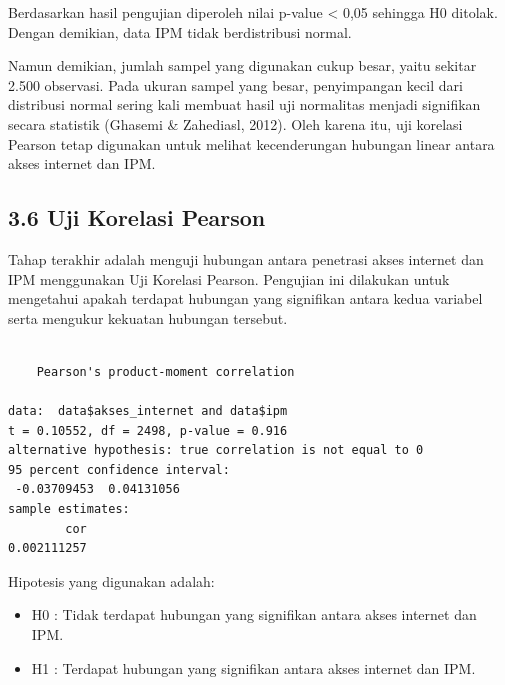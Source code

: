 \documentclass[
  indonesian,
  letterpaper,
  DIV=11,
  numbers=noendperiod]{scrartcl}
\newenvironment{Shaded}{\begin{snugshade}}{\end{snugshade}}
\newcommand{\AttributeTok}[1]{\textcolor[rgb]{0.40,0.45,0.13}{#1}}
\newcommand{\FunctionTok}[1]{\textcolor[rgb]{0.28,0.35,0.67}{#1}}
\newcommand{\NormalTok}[1]{\textcolor[rgb]{0.00,0.23,0.31}{#1}}
\newcommand{\OtherTok}[1]{\textcolor[rgb]{0.00,0.23,0.31}{#1}}
\newcommand{\SpecialCharTok}[1]{\textcolor[rgb]{0.37,0.37,0.37}{#1}}
\newcommand{\StringTok}[1]{\textcolor[rgb]{0.13,0.47,0.30}{#1}}
\providecommand{\tightlist}{%
  \setlength{\itemsep}{0pt}\setlength{\parskip}{0pt}}
\begin{document}
Berdasarkan hasil pengujian diperoleh nilai p-value \textless{} 0,05
sehingga H0 ditolak. Dengan demikian, data IPM tidak berdistribusi
normal.

Namun demikian, jumlah sampel yang digunakan cukup besar, yaitu sekitar
2.500 observasi. Pada ukuran sampel yang besar, penyimpangan kecil dari
distribusi normal sering kali membuat hasil uji normalitas menjadi
signifikan secara statistik (Ghasemi \& Zahediasl, 2012). Oleh karena
itu, uji korelasi Pearson tetap digunakan untuk melihat kecenderungan
hubungan linear antara akses internet dan IPM.

\subsection{3.6 Uji Korelasi Pearson}\label{uji-korelasi-pearson}

Tahap terakhir adalah menguji hubungan antara penetrasi akses internet
dan IPM menggunakan Uji Korelasi Pearson. Pengujian ini dilakukan untuk
mengetahui apakah terdapat hubungan yang signifikan antara kedua
variabel serta mengukur kekuatan hubungan tersebut.

\begin{Shaded}
\end{Shaded}

\begin{verbatim}

    Pearson's product-moment correlation

data:  data$akses_internet and data$ipm
t = 0.10552, df = 2498, p-value = 0.916
alternative hypothesis: true correlation is not equal to 0
95 percent confidence interval:
 -0.03709453  0.04131056
sample estimates:
        cor 
0.002111257 
\end{verbatim}

Hipotesis yang digunakan adalah:

\begin{itemize}
\tightlist
\item
  H0 : Tidak terdapat hubungan yang signifikan antara akses internet dan
  IPM.
\item
  H1 : Terdapat hubungan yang signifikan antara akses internet dan IPM.
\end{itemize}
\end{document}
